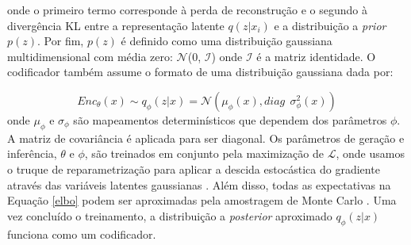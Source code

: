onde o primeiro termo corresponde à perda de reconstrução e o segundo à divergência KL entre a representação latente $q(z|x_i)$ e a distribuição a \textit{prior} $p(z)$.
Por fim, $p(z)$ é definido como uma distribuição gaussiana multidimensional com média zero: $\mathcal{N}$(0, $\mathcal{I}$) onde $\mathcal{I}$ é a matriz identidade. O codificador também assume o formato de uma distribuição gaussiana dada por:

\begin{equation}
Enc_{\theta}(x) \sim q_{\phi}(z|x) = \mathcal{N}(\mu_{\phi}(x), diag\ \ \sigma_{\phi}^2(x))
\end{equation}
onde $\mu_{\phi}$ e $\sigma_{\phi}$ são mapeamentos determinísticos que dependem dos parâmetros $\phi$. A matriz de covariância é aplicada para ser diagonal. Os parâmetros de geração e inferência, $\theta$ e  $\phi$, são treinados em conjunto pela maximização de $\mathcal{L}$, onde usamos o truque de reparametrização para aplicar a descida estocástica do gradiente através das variáveis latentes gaussianas \cite{sonderby2016ladder}. Além disso, todas as expectativas na Equação \ref{elbo} podem ser aproximadas pela amostragem de Monte Carlo \cite{Goodfellow2016}.
Uma vez concluído o treinamento, a distribuição a \textit{posterior} aproximado $q_{\phi}(z|x)$ funciona como um codificador.







